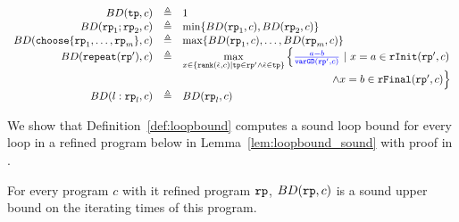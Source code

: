 \begin{defn}
\label{def:loopbound}
  \[
    \begin{array}{rcl}
      BD(\tpath, c) & \triangleq & 1 \\
      BD(\rprog_1;\rprog_2, c) & \triangleq & \min \left\{BD(\rprog_1, c), BD(\rprog_2, c) \right\} \\
      BD(\rpchoose{\rprog_1, \ldots, \rprog_m }, c) & \triangleq 
      & \max\left\{ BD(\rprog_1, c), \ldots, BD(\rprog_m, c) \right\} \\
      BD(\rprepeat(\rprog'), c) & \triangleq 
      &
      \max\limits_{x \in \left\{ \locbound(\absevent, c) | \tpath \in \rprog' \land \absevent \in \tpath \right\}}
      \Big\{ \highlight{\frac{a - b}{\varGD(\rprog', c)}} ~\vert~
      x = a \in \rfinit(\rprog', c)
      \\ & & \qquad \qquad \qquad \qquad \qquad \qquad \qquad 
      \land x = b \in \rffinal(\rprog', c)
      \Big\} 
      \\
      BD(l: \rprog_l, c) & \triangleq & BD(\rprog_l, c)
    \end{array}
  \]
\end{defn}
We show that Definition~\ref{def:loopbound} computes a sound loop bound for every loop in a refined program below in Lemma~\ref{lem:loopbound_sound} with proof in .
\begin{lem}
  \label{lem:loopbound_sound}
  For every program $c$ with it refined program $\mathtt{rp}$,
  $BD(\mathtt{rp}, c)$ is a sound upper bound on the iterating times of this program.
\end{lem}


